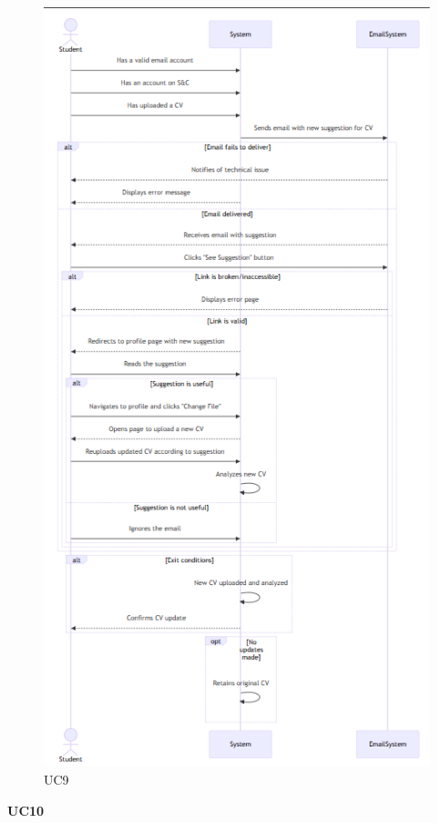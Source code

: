 \begin{figure}
    \centering
    \includegraphics[width=0.5\linewidth]{RASD//Images/UC8.png}
    \caption{UC9}
\end{figure}

\pagebreak
\textbf{UC10}

